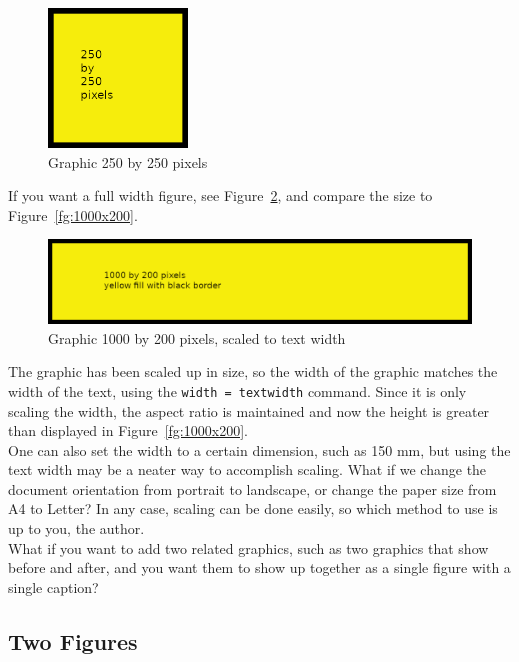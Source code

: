 \begin{figure}[H]
\centering
\includegraphics[width=0.33\textwidth]{250x250}
\caption{Graphic 250 by 250 pixels}\label{fg:250x250-2}
\end{figure}


If you want a full width figure, see Figure~\ref{fg:1000x200-2}, and compare the size to Figure~\ref{fg:1000x200}.

\begin{figure}[H]
\centering
\includegraphics[width=\textwidth]{1000x200}
\caption{Graphic 1000 by 200 pixels, scaled to text width}\label{fg:1000x200-2}
\end{figure}

The graphic has been scaled up in size, so the width of the graphic matches the width of the text, using the \texttt{width = textwidth} command.  Since it is only scaling the width, the aspect ratio is maintained and now the height is greater than displayed in Figure~\ref{fg:1000x200}.\\

One can also set the width to a certain dimension, such as 150 mm, but using the text width may be a neater way to accomplish scaling.  What if we change the document orientation from portrait to landscape, or change the paper size from A4 to Letter?  In any case, scaling can be done easily, so which method to use is up to you, the author.\\

What if you want to add two related graphics, such as two graphics that show before and after, and you want them to show up together as a single figure with a single caption?

\newpage

\subsection*{Two Figures}

